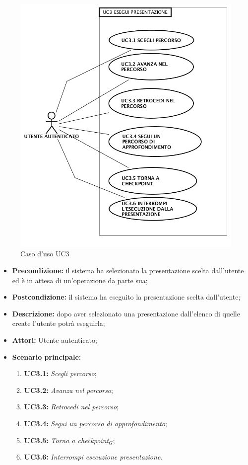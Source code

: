 \begin{figure}[H]
	\begin{center}
	\includegraphics[scale=0.4]{diagram/UC3.png}
	\caption{Caso d'uso UC3}
	\end{center}
\end{figure}
\begin{itemize}
	\item \textbf{Precondizione:} il sistema ha selezionato la presentazione scelta dall'utente ed è in attesa di un’operazione da parte sua;
	\item \textbf{Postcondizione:} il sistema ha eseguito la presentazione scelta dall'utente;
	\item \textbf{Descrizione:} dopo aver selezionato una presentazione dall'elenco di quelle create l'utente potrà eseguirla;
	\item \textbf{Attori:} Utente autenticato;
	\item \textbf{Scenario principale:}
	\begin{enumerate}
		\item \textbf{ UC3.1:} \textit{ Scegli percorso};
		\item \textbf{ UC3.2:} \textit{ Avanza nel percorso};
		\item \textbf{ UC3.3:} \textit{ Retrocedi nel percorso};
		\item \textbf{ UC3.4:} \textit{ Segui un percorso di approfondimento};
		\item \textbf{ UC3.5:} \textit{ Torna a checkpoint$_G$};
		\item \textbf{ UC3.6:} \textit{ Interrompi esecuzione presentazione}.
	\end{enumerate}
\end{itemize}
